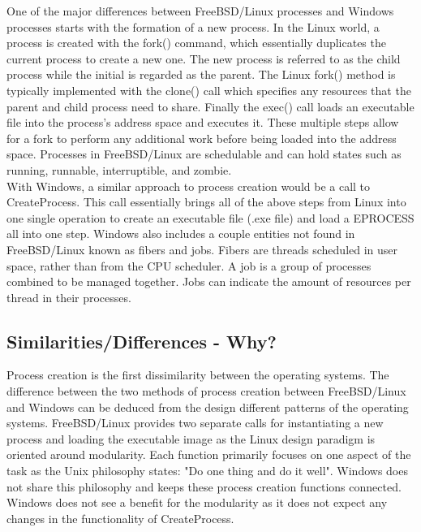 \documentclass[letterpaper,10pt,titlepage]{article}
\begin{document}
One of the major differences between FreeBSD/Linux processes and Windows processes starts with the formation of a new process.  In the Linux world, a process is created with the fork() command, which essentially duplicates the current process to create a new one.  The new process is referred to as the child process while the initial is regarded as the parent.  The Linux fork() method is typically implemented with the clone() call which specifies any resources that the parent and child process need to share.  Finally the exec() call loads an executable file into the process's address space and executes it.  These multiple steps allow for a fork to perform any additional work before being loaded into the address space.  Processes in FreeBSD/Linux are schedulable and can hold states such as running, runnable, interruptible, and zombie.\cite{lkd3}\\

With Windows, a similar approach to process creation would be a call to CreateProcess.  This call essentially brings all of the above steps from Linux into one single operation to create an executable file (.exe file) and load a EPROCESS all into one step.\cite{mwi5}  Windows also includes a couple entities not found in FreeBSD/Linux known as fibers and jobs.  Fibers are threads scheduled in user space, rather than from the CPU scheduler.  A job is a group of processes combined to be managed together.  Jobs can indicate the amount of resources per thread in their processes.

\subsection{Similarities/Differences - Why?}

Process creation is the first dissimilarity between the operating systems.  The difference between the two methods of process creation between FreeBSD/Linux and Windows can be deduced from the design different patterns of the operating systems.  FreeBSD/Linux provides two separate calls for instantiating a new process and loading the executable image as the Linux design paradigm is oriented around modularity.  Each function primarily focuses on one aspect of the task as the Unix philosophy states: "Do one thing and do it well".\cite{philosophy}  Windows does not share this philosophy and keeps these process creation functions connected.  Windows does not see a benefit for the modularity as it does not expect any changes in the functionality of CreateProcess.\\
\end{document}
